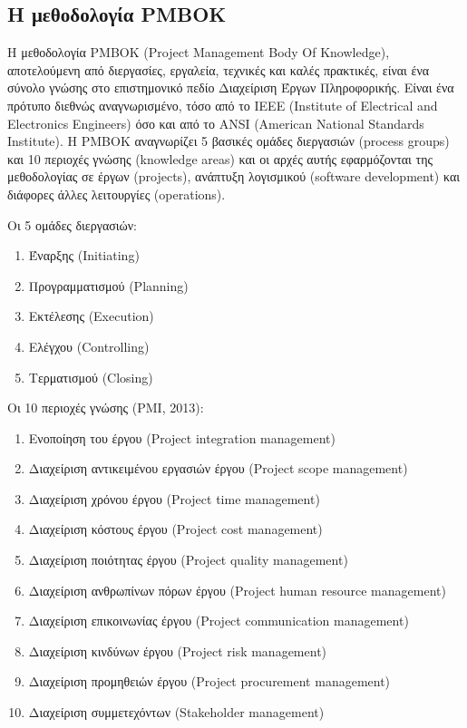 \documentclass[12pt]{turabian-researchpaper}
\begin{document}
\subsection{Η μεθοδολογία PMBOK}\label{method_pmbok}
Η μεθοδολογία PMBOK (Project Management Body Οf Knowledge), αποτελούμενη από διεργασίες, εργαλεία, τεχνικές και καλές πρακτικές, είναι ένα σύνολο γνώσης στο επιστημονικό πεδίο Διαχείριση Έργων Πληροφορικής. Είναι ένα πρότυπο διεθνώς αναγνωρισμένο, τόσο από το IEEE (Institute of Electrical and Electronics Engineers) όσο και από το ANSI (American National Standards Institute). Η PMBOK αναγνωρίζει 5 βασικές ομάδες διεργασιών (process groups) και 10 περιοχές γνώσης (knowledge areas) και οι αρχές αυτής εφαρμόζονται της μεθοδολογίας σε έργων (projects), ανάπτυξη λογισμικού (software development) και διάφορες άλλες λειτουργίες (operations). \par
{\parindent0pt
    Οι 5 ομάδες διεργασιών:
    \begin{enumerate}
        \item Έναρξης (Initiating)
        \item Προγραμματισμού (Planning)
        \item Εκτέλεσης (Execution)
        \item Ελέγχου (Controlling)
        \item Τερματισμού (Closing)
    \end{enumerate}
    Οι 10 περιοχές γνώσης (PMI, 2013):
    \begin{enumerate}
        \item Ενοποίηση του έργου (Project integration management)
        \item Διαχείριση αντικειμένου εργασιών έργου (Project scope management)
        \item Διαχείριση χρόνου έργου (Project time management)
        \item Διαχείριση κόστους έργου (Project cost management)
        \item Διαχείριση ποιότητας έργου (Project quality management)
        \item Διαχείριση ανθρωπίνων πόρων έργου (Project human resource management)
        \item Διαχείριση επικοινωνίας έργου (Project communication management)
        \item Διαχείριση κινδύνων έργου (Project risk management)
        \item Διαχείριση προμηθειών έργου (Project procurement management)
        \item Διαχείριση συμμετεχόντων (Stakeholder management)
    \end{enumerate}
}
\end{document}
